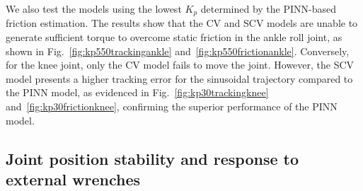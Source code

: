 We also test the models using the lowest $K_p$ determined by the PINN-based friction estimation. The results show that the CV and SCV models are unable to generate sufficient torque to overcome static friction in the ankle roll joint, as shown in Fig.~\ref{fig:kp550trackingankle} and~\ref{fig:kp550frictionankle}. Conversely, for the knee joint, only the CV model fails to move the joint. However, the SCV model presents a higher tracking error for the sinusoidal trajectory compared to the PINN model, as evidenced in Fig.~\ref{fig:kp30trackingknee} and~\ref{fig:kp30frictionknee}, confirming the superior performance of the PINN model.

\subsection{Joint position stability and response to external wrenches}

